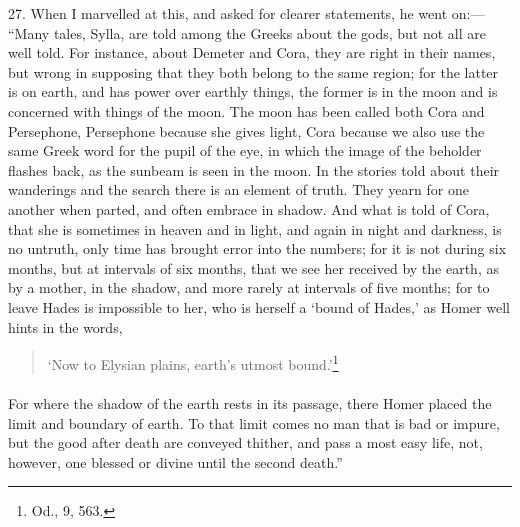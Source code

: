 \documentclass[a4paper, 11pt, oneside, polutonikogreek, english]{article}
\begin{document}
27. When I marvelled at this, and asked for clearer statements, he went on:--- ``Many tales, Sylla, are told among the Greeks about the gods, but not all are well told. For instance, about Demeter and Cora, they are right in their names, but wrong in supposing that they both belong to the same region; for the latter is on earth, and has power over earthly things, the former is in the moon and is concerned with things of the moon. The moon has been called both Cora and Persephone, Persephone because she gives light, Cora because we also use the same Greek word for the pupil of the eye, in which the image of the beholder flashes back, as the sunbeam is seen in the moon. In the stories told about their wanderings and the search there is an element of truth. They yearn for one another when parted, and often embrace in shadow. And what is told of Cora, that she is sometimes in heaven and in light, and again in night and darkness, is no untruth, only time has brought error into the numbers; for it is not during six months, but at intervals of six months, that we see her received by the earth, as by a mother, in the shadow, and more rarely at intervals of five months; for to leave Hades is impossible to her, who is herself a `bound of Hades,' as Homer well hints in the words,
\begin{quotation}
`Now to Elysian plains, earth's utmost bound.'\footnote{Od., 9, 563.}
\end{quotation}
\paragraph{}
For where the shadow of the earth rests in its passage, there Homer placed the limit and boundary of earth. To that limit comes no man that is bad or impure, but the good after death are conveyed thither, and pass a most easy life, not, however, one blessed or divine until the second death.''
\end{document}
